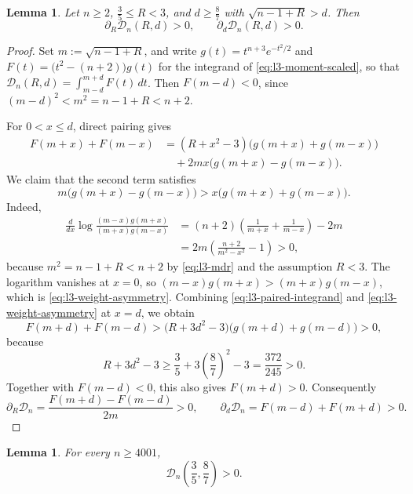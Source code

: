 \documentclass[11pt]{article}
\numberwithin{equation}{section}
\newtheorem{lemma}[theorem]{Lemma}
\theoremstyle{definition}
\begin{document}
\begin{lemma}\label{lem:l3-monotone}
Let $n\geq2$, $\frac35\leq R<3$, and $d\geq\frac87$ with
$\sqrt{n-1+R}>d$. Then
\[
    \partial_R\mathcal D_n(R,d)>0,
    \qquad
    \partial_d\mathcal D_n(R,d)>0.
\]
\end{lemma}

\begin{proof}
Set $m:=\sqrt{n-1+R}$, and write
$g(t)=t^{n+3}e^{-t^2/2}$ and $F(t)=\bigl(t^2-(n+2)\bigr)g(t)$ for the
integrand of \eqref{eq:l3-moment-scaled}, so that
$\mathcal D_n(R,d)=\int_{m-d}^{m+d}F(t)\,dt$. Then $F(m-d)<0$, since
$(m-d)^2<m^2=n-1+R<n+2$.

For $0<x\leq d$, direct pairing gives
\begin{equation}\label{eq:l3-paired-integrand}
\begin{aligned}
    F(m+x)+F(m-x)
    &=(R+x^2-3)\bigl(g(m+x)+g(m-x)\bigr)\\
    &\quad+2mx\bigl(g(m+x)-g(m-x)\bigr).
\end{aligned}
\end{equation}
We claim that the second term satisfies
\begin{equation}\label{eq:l3-weight-asymmetry}
    m\bigl(g(m+x)-g(m-x)\bigr)
    >x\bigl(g(m+x)+g(m-x)\bigr).
\end{equation}
Indeed,
\[
\begin{aligned}
    \frac{d}{dx}\log\frac{(m-x)g(m+x)}{(m+x)g(m-x)}
    &=(n+2)\left(\frac1{m+x}+\frac1{m-x}\right)-2m\\
    &=2m\left(\frac{n+2}{m^2-x^2}-1\right)>0,
\end{aligned}
\]
because $m^2=n-1+R<n+2$ by \eqref{eq:l3-mdr} and the assumption $R<3$.
The logarithm vanishes at $x=0$, so
$(m-x)g(m+x)>(m+x)g(m-x)$, which is
\eqref{eq:l3-weight-asymmetry}.
Combining \eqref{eq:l3-paired-integrand} and
\eqref{eq:l3-weight-asymmetry} at $x=d$, we obtain
\[
    F(m+d)+F(m-d)
    >\bigl(R+3d^2-3\bigr)\bigl(g(m+d)+g(m-d)\bigr)>0,
\]
because
\[
    R+3d^2-3\geq\frac35+3\left(\frac87\right)^2-3
    =\frac{372}{245}>0.
\]
Together with $F(m-d)<0$, this also gives $F(m+d)>0$. Consequently
\[
 \partial_R\mathcal D_n=\frac{F(m+d)-F(m-d)}{2m}>0,\qquad
 \partial_d\mathcal D_n=F(m-d)+F(m+d)>0.
\]
\end{proof}

\begin{lemma}\label{lem:l3-corner}
For every $n\geq4001$,
\[
    \mathcal D_n\left(\frac35,\frac87\right)>0.
\]
\end{lemma}
\end{document}
